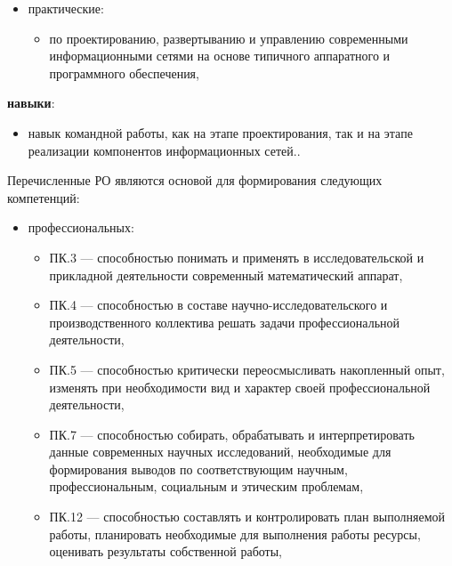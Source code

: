 {\begin{itemize}
\begin{itemize}
\end{itemize}
\item практические:
\begin{itemize}
\item по проектированию, развертыванию и управлению современными информационными сетями на основе типичного аппаратного и программного обеспечения,
\end{itemize}
\end{itemize}
\textbf{навыки}:
\begin{itemize}
\item навык командной работы, как на этапе проектирования, так и на этапе реализации компонентов информационных сетей..
\end{itemize}

Перечисленные РО являются основой для формирования следующих компетенций:
\begin{itemize}
\item профессиональных: \begin{itemize}
\item ПК.3 — способностью понимать и применять в исследовательской и прикладной деятельности современный математический аппарат,\item ПК.4 — способностью в составе научно-исследовательского и производственного коллектива решать задачи профессиональной деятельности,\item ПК.5 — способностью критически переосмысливать накопленный опыт, изменять при необходимости вид и характер своей профессиональной деятельности,\item ПК.7 — способностью собирать, обрабатывать и интерпретировать данные современных научных исследований, необходимые для формирования выводов по соответствующим научным, профессиональным, социальным и этическим проблемам,\item ПК.12 — способностью составлять и контролировать план выполняемой работы, планировать необходимые для выполнения работы ресурсы, оценивать результаты собственной работы,
\end{itemize}
\end{itemize}
}

\newpage
